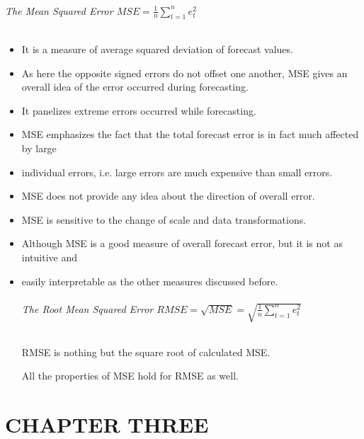 \documentclass[
  onepage,
  openany]{scrbook}
\let\oldsubparagraph\subparagraph
\renewcommand{\subparagraph}[1]{\oldsubparagraph{#1}\mbox{}}
\begin{document}
\hypertarget{the-mean-squared-error-displaystyle-mse-frac1nsum_t1ne2_t}{%
\subparagraph{\texorpdfstring{The Mean Squared Error
\(\displaystyle MSE = \frac{1}{n}\sum_{t=1}^{n}e^{2}_{t}\)}{The Mean Squared Error \textbackslash displaystyle MSE = \textbackslash frac\{1\}\{n\}\textbackslash sum\_\{t=1\}\^{}\{n\}e\^{}\{2\}\_\{t\}}}\label{the-mean-squared-error-displaystyle-mse-frac1nsum_t1ne2_t}}

\begin{itemize}
\item
  It is a measure of average squared deviation of forecast values.
\item
  As here the opposite signed errors do not offset one another, MSE
  gives an overall idea of the error occurred during forecasting.
\item
  It panelizes extreme errors occurred while forecasting.
\item
  MSE emphasizes the fact that the total forecast error is in fact much
  affected by large
\item
  individual errors, i.e. large errors are much expensive than small
  errors.
\item
  MSE does not provide any idea about the direction of overall error.
\item
  MSE is sensitive to the change of scale and data transformations.
\item
  Although MSE is a good measure of overall forecast error, but it is
  not as intuitive and
\item
  easily interpretable as the other measures discussed before.

  \hypertarget{the-root-mean-squared-error-displaystyle-rmse-sqrtmse-sqrt-frac1nsum_t1ne2_t}{%
  \subparagraph{\texorpdfstring{The Root Mean Squared Error
  \(\displaystyle RMSE = \sqrt{MSE} = \sqrt {\frac{1}{n}\sum_{t=1}^{n}e^{2}_{t}}\)}{The Root Mean Squared Error \textbackslash displaystyle RMSE = \textbackslash sqrt\{MSE\} = \textbackslash sqrt \{\textbackslash frac\{1\}\{n\}\textbackslash sum\_\{t=1\}\^{}\{n\}e\^{}\{2\}\_\{t\}\}}}\label{the-root-mean-squared-error-displaystyle-rmse-sqrtmse-sqrt-frac1nsum_t1ne2_t}}

  RMSE is nothing but the square root of calculated MSE.

  All the properties of MSE hold for RMSE as well.
\end{itemize}

\hypertarget{chapter-three}{%
\chapter{CHAPTER THREE}\label{chapter-three}}
\end{document}
